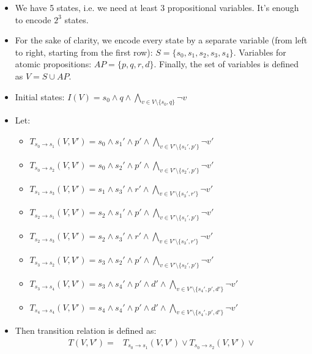 \documentclass[language=en,sheet=4,prefix]{exercise}
\begin{document}
\begin{solution}
\begin{itemize}
  \item We have 5 states, i.e. we need at least $3$ propositional variables. It's enough to encode $2^3$ states. 
  \item For the sake of clarity, we encode every state by a separate variable (from left to right, starting from the first row): $S = \{ s_0, s_1, s_2, s_3, s_4\}$. Variables for atomic propositions: 
  $AP = \{ p, q, r, d \}$. Finally, the set of variables is defined as $V = S \cup AP$.
  \item Initial states: $I(V) = s_0 \wedge q \wedge \bigwedge_{v \in V \setminus \{ s_0, q \}} \neg v$  
  \item Let: 
    \begin{itemize}
      \item $T_{s_0 \rightarrow s_1}(V, V') = s_0 \wedge s_1' \wedge p'  \wedge \bigwedge_{v \in V' \setminus \{ s_1', p' \}} \neg v'$            
      \item $T_{s_0 \rightarrow s_2}(V, V') = s_0 \wedge s_2' \wedge p'  \wedge \bigwedge_{v \in V' \setminus \{ s_2', p' \}} \neg v'$
      \item $T_{s_1 \rightarrow s_3}(V, V') = s_1 \wedge s_3' \wedge r'  \wedge \bigwedge_{v \in V' \setminus \{ s_3', r' \}} \neg v'$      
      \item $T_{s_2 \rightarrow s_1}(V, V') = s_2 \wedge s_1' \wedge p'  \wedge \bigwedge_{v \in V' \setminus \{ s_1', p' \}} \neg v'$
      \item $T_{s_2 \rightarrow s_3}(V, V') = s_2 \wedge s_3' \wedge r'  \wedge \bigwedge_{v \in V' \setminus \{ s_3', r' \}} \neg v'$
      \item $T_{s_3 \rightarrow s_2}(V, V') = s_3 \wedge s_2' \wedge p'  \wedge \bigwedge_{v \in V' \setminus \{ s_2', p' \}} \neg v'$
      \item $T_{s_3 \rightarrow s_4}(V, V') = s_3 \wedge s_4' \wedge p' \wedge d'  \wedge \bigwedge_{v \in V' \setminus \{ s_4', p', d' \}} \neg v'$
      \item $T_{s_4 \rightarrow s_4}(V, V') = s_4 \wedge s_4' \wedge p' \wedge d'  \wedge \bigwedge_{v \in V' \setminus \{ s_4', p', d' \}} \neg v'$
    \end{itemize}
    \item Then transition relation is defined as:
      \begin{align*}
      T(V, V') = & 
        T_{s_0 \rightarrow s_1}(V, V') \vee T_{s_0 \rightarrow s_2}(V, V') \vee \\

\end{align*}
\end{itemize}
\end{solution}
\end{document}
